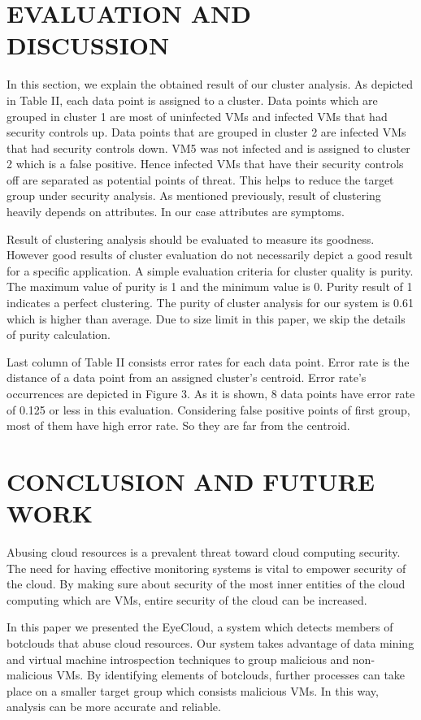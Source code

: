 \documentclass[conference]{IEEEtran}
\begin{document}
\section{EVALUATION AND DISCUSSION}
In this section, we explain the obtained result of our cluster analysis. As depicted in Table II, each data point is assigned to a cluster. Data points which are grouped in cluster 1 are most of uninfected VMs and infected VMs that had security controls up. Data points that are grouped in cluster 2 are infected VMs that had security controls down. VM5 was not infected and is assigned to cluster 2 which is a false positive. Hence infected VMs that have their security controls off are separated as potential points of threat. This helps to reduce the target group under security analysis. As mentioned previously, result of clustering heavily depends on attributes. In our case attributes are symptoms. 

Result of clustering analysis should be evaluated to measure its goodness. However good results of cluster evaluation do not necessarily depict a good result for a specific application. A simple evaluation criteria for cluster quality is purity. The maximum value of purity is 1 and the minimum value is 0. Purity result of 1 indicates a perfect clustering. The purity of cluster analysis for our system is 0.61 which is higher than average. Due to size limit in this paper, we skip the details of purity calculation. 

Last column of Table II consists error rates for each data point. Error rate is the distance of a data point from an assigned cluster's centroid. Error rate's occurrences are depicted in Figure 3. As it is shown, 8 data points have error rate of 0.125 or less in this evaluation. Considering false positive points of first group, most of them have high error rate. So they are far from the centroid.   


\section{CONCLUSION AND FUTURE WORK}
Abusing cloud resources is a prevalent threat toward cloud computing security. The need for having effective monitoring systems is vital to empower security of the cloud. By making sure about security of the most inner entities of the cloud computing which are VMs, entire security of the cloud can be increased. 

In this paper we presented the EyeCloud, a system which detects members of botclouds that abuse cloud resources. Our system takes advantage of data mining and virtual machine introspection techniques to group malicious and non-malicious VMs. By identifying elements of botclouds, further processes can take place on a smaller target group which consists malicious VMs. In this way, analysis can be more accurate and reliable. 
\end{document}
